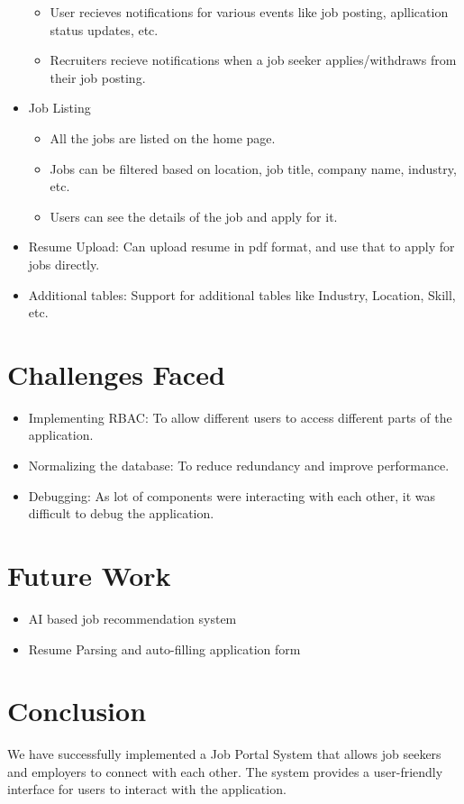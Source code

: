\documentclass[12pt]{article}
\begin{document}
\begin{itemize}
\begin{itemize}
        \item User recieves notifications for various events like job posting, apllication status updates, etc.
        \item Recruiters recieve notifications when a job seeker applies/withdraws from their job posting.
    \end{itemize}
    \item Job Listing
    \begin{itemize}
        \item All the jobs are listed on the home page.
        \item Jobs can be filtered based on location, job title, company name, industry, etc.
        \item Users can see the details of the job and apply for it.
    \end{itemize}
    \item Resume Upload: Can upload resume in pdf format, and use that to apply for jobs directly.
    \item Additional tables: Support for additional tables like Industry, Location, Skill, etc.
\end{itemize}

\section*{Challenges Faced}
\begin{itemize}
    \item Implementing RBAC: To allow different users to access different parts of the application.
    \item Normalizing the database: To reduce redundancy and improve performance.
    \item Debugging: As lot of components were interacting with each other, it was difficult to debug the application.
\end{itemize}

\section*{Future Work}
\begin{itemize}
    \item AI based job recommendation system
    \item Resume Parsing and auto-filling application form
\end{itemize}

\section*{Conclusion}
We have successfully implemented a Job Portal System that allows job seekers and employers to connect with each other. The system provides a user-friendly interface for users to interact with the application.
\end{document}
